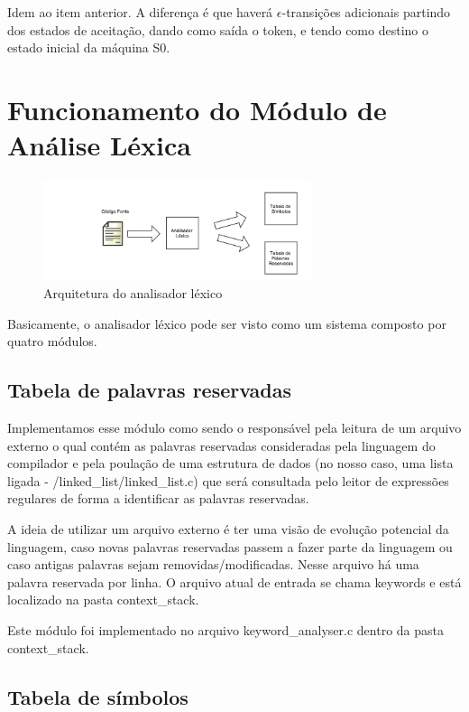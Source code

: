 Idem ao item anterior. A diferença é que haverá $\epsilon$-transições adicionais partindo dos estados de aceitação, dando como saída o token, e tendo como destino o estado inicial da máquina S0.

\section{Funcionamento do Módulo de Análise Léxica}

\begin{figure}[H]
  \caption{Arquitetura do analisador léxico}
  \centering
    \includegraphics[width=0.7\textwidth]{../0-lexico/automatos/lexical_analyzer}
\end{figure}

Basicamente, o analisador léxico pode ser visto como um sistema composto por quatro módulos.

\subsection{Tabela de palavras reservadas}

Implementamos esse módulo como sendo o responsável pela leitura de um arquivo externo o qual contém as palavras reservadas consideradas pela linguagem do compilador e pela poulação de uma estrutura de dados (no nosso caso, uma lista ligada - /linked\_list/linked\_list.c) que será consultada pelo leitor de expressões regulares de forma a identificar as palavras reservadas.

A ideia de utilizar um arquivo externo é ter uma visão de evolução potencial da linguagem, caso novas palavras reservadas passem a fazer parte da linguagem ou caso antigas palavras sejam removidas/modificadas. Nesse arquivo há uma palavra reservada por linha. O arquivo atual de entrada se chama keywords e está localizado na pasta context\_stack.

Este módulo foi implementado no arquivo keyword\_analyser.c dentro da pasta context\_stack.

\subsection{Tabela de símbolos}


